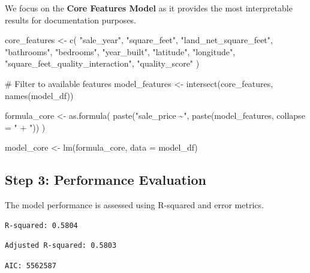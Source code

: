 \documentclass[
  english,
  letterpaper,
  DIV=11,
  numbers=noendperiod]{scrreprt}
\newenvironment{Shaded}{\begin{snugshade}}{\end{snugshade}}
\newcommand{\AttributeTok}[1]{\textcolor[rgb]{0.40,0.45,0.13}{#1}}
\newcommand{\CommentTok}[1]{\textcolor[rgb]{0.37,0.37,0.37}{#1}}
\newcommand{\FunctionTok}[1]{\textcolor[rgb]{0.28,0.35,0.67}{#1}}
\newcommand{\NormalTok}[1]{\textcolor[rgb]{0.00,0.23,0.31}{#1}}
\newcommand{\OtherTok}[1]{\textcolor[rgb]{0.00,0.23,0.31}{#1}}
\newcommand{\StringTok}[1]{\textcolor[rgb]{0.13,0.47,0.30}{#1}}
\begin{document}
We focus on the \textbf{Core Features Model} as it provides the most
interpretable results for documentation purposes.

\begin{Shaded}
\begin{Highlighting}[]
\NormalTok{core\_features }\OtherTok{\textless{}{-}} \FunctionTok{c}\NormalTok{(}
  \StringTok{"sale\_year"}\NormalTok{, }\StringTok{"square\_feet"}\NormalTok{, }\StringTok{"land\_net\_square\_feet"}\NormalTok{, }\StringTok{"bathrooms"}\NormalTok{, }
  \StringTok{"bedrooms"}\NormalTok{, }\StringTok{"year\_built"}\NormalTok{, }\StringTok{"latitude"}\NormalTok{, }\StringTok{"longitude"}\NormalTok{,}
  \StringTok{"square\_feet\_quality\_interaction"}\NormalTok{, }\StringTok{"quality\_score"}
\NormalTok{)}

\CommentTok{\# Filter to available features}
\NormalTok{model\_features }\OtherTok{\textless{}{-}} \FunctionTok{intersect}\NormalTok{(core\_features, }\FunctionTok{names}\NormalTok{(model\_df))}

\NormalTok{formula\_core }\OtherTok{\textless{}{-}} \FunctionTok{as.formula}\NormalTok{(}
  \FunctionTok{paste}\NormalTok{(}\StringTok{"sale\_price \textasciitilde{}"}\NormalTok{, }\FunctionTok{paste}\NormalTok{(model\_features, }\AttributeTok{collapse =} \StringTok{" + "}\NormalTok{))}
\NormalTok{)}

\NormalTok{model\_core }\OtherTok{\textless{}{-}} \FunctionTok{lm}\NormalTok{(formula\_core, }\AttributeTok{data =}\NormalTok{ model\_df)}
\end{Highlighting}
\end{Shaded}

\subsection{Step 3: Performance
Evaluation}\label{step-3-performance-evaluation}

The model performance is assessed using R-squared and error metrics.

\begin{verbatim}
R-squared: 0.5804 
\end{verbatim}

\begin{verbatim}
Adjusted R-squared: 0.5803 
\end{verbatim}

\begin{verbatim}
AIC: 5562587 
\end{verbatim}
\end{document}
